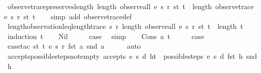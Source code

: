 \begin{isabellebody}
\endisatagproof
{\isafoldproof}%
%
\isadelimproof
\isanewline
%
\endisadelimproof
\isanewline
{}\isamarkupfalse%
\ observe{\isacharunderscore}trace{\isacharunderscore}preserves{\isacharunderscore}length{\isacharcolon}\ {\isachardoublequoteopen}length\ {\isacharparenleft}observe{\isacharunderscore}all\ e\ s\ r\ st\ t{\isacharparenright}\ {\isacharequal}\ length\ {\isacharparenleft}observe{\isacharunderscore}trace\ e\ s\ r\ st\ t{\isacharparenright}{\isachardoublequoteclose}\isanewline
%
\isadelimproof
\ \ %
\endisadelimproof
%
\isatagproof
{}\isamarkupfalse%
\ {\isacharparenleft}simp\ add{\isacharcolon}\ observe{\isacharunderscore}trace{\isacharunderscore}def{\isacharparenright}%
\endisatagproof
{\isafoldproof}%
%
\isadelimproof
\isanewline
%
\endisadelimproof
\isanewline
{}\isamarkupfalse%
\ length{\isacharunderscore}observation{\isacharunderscore}leq{\isacharunderscore}length{\isacharunderscore}trace{\isacharcolon}\ {\isachardoublequoteopen}{\isasymAnd}s\ r{\isachardot}\ length\ {\isacharparenleft}observe{\isacharunderscore}all\ e\ s\ r\ st\ t{\isacharparenright}\ {\isasymle}\ length\ t{\isachardoublequoteclose}\isanewline
%
\isadelimproof
%
\endisadelimproof
%
\isatagproof
{}\isamarkupfalse%
\ {\isacharparenleft}induction\ t{\isacharparenright}\isanewline
\ \ \isamarkupfalse%
\ Nil\isanewline
\ \ \isamarkupfalse%
\ \isamarkupfalse%
\ {\isacharquery}case\ \isamarkupfalse%
\ simp\isanewline
{}\isamarkupfalse%
\isanewline
\ \ \isamarkupfalse%
\ {\isacharparenleft}Cons\ a\ t{\isacharparenright}\isanewline
\ \ \isamarkupfalse%
\ \isamarkupfalse%
\ {\isacharquery}case\isanewline
\ \ \ \ \isamarkupfalse%
\ {\isacharparenleft}case{\isacharunderscore}tac\ {\isachardoublequoteopen}st\ t\ e\ s\ r\ {\isacharparenleft}fst\ a{\isacharparenright}\ {\isacharparenleft}snd\ a{\isacharparenright}{\isachardoublequoteclose}{\isacharparenright}\isanewline
\ \ \ \ \isamarkupfalse%
\ auto\isanewline
{}\isamarkupfalse%
%
\endisatagproof
{\isafoldproof}%
%
\isadelimproof
\isanewline
%
\endisadelimproof
\isanewline
{}\isamarkupfalse%
\ accepts{\isacharunderscore}possible{\isacharunderscore}steps{\isacharunderscore}not{\isacharunderscore}empty{\isacharcolon}\ {\isachardoublequoteopen}accepts\ e\ s\ d\ {\isacharparenleft}h{\isacharhash}t{\isacharparenright}\ {\isasymLongrightarrow}\ possible{\isacharunderscore}steps\ e\ s\ d\ {\isacharparenleft}fst\ h{\isacharparenright}\ {\isacharparenleft}snd\ h{\isacharparenright}\ {\isasymnoteq}\ {\isacharbraceleft}{\isacharbar}{\isacharbar}{\isacharbraceright}{\isachardoublequoteclose}\isanewline

\end{isabellebody}
